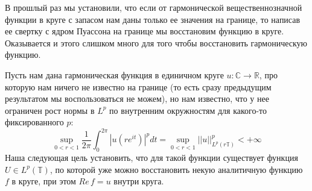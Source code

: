 \documentclass[12pt,a4paper]{article} %
\newcommand{\R}{\mathbb{R}}
\newcommand{\Co}{\mathbb{C}}
\begin{document}
	В прошлый раз мы установили, что если от гармонической вещественнозначной функции в круге с запасом нам даны только ее значения на границе, то написав ее свертку с ядром Пуассона на границе мы восстановим функцию в круге. Оказывается и этого слишком много для того чтобы восстановить гармоническую функцию.
	
	Пусть нам дана гармоническая функция в единичном круге $u:\Co\rightarrow\R$, про которую нам ничего не известно на границе (то есть сразу предыдущим результатом мы воспользоваться не можем), но нам известно, что у нее ограничен рост нормы в $L^p$ по внутренним окружностям для какого-то фиксированного $p$:
	$$\sup\limits_{0<r<1}\frac{1}{2\pi}\int_0^{2\pi}|u(re^{it})|^pdt=\sup\limits_{0<r<1}||u||_{L^p(r\mathbb{T})}^p<+\infty$$
	Наша следующая цель установить, что для такой функции существует функция\\ $U\in L^p(\mathbb{T})$, по которой уже можно восстановить некую аналитичную функцию $f$ в круге, при этом $Re\,f=u$ внутри круга.
	
\end{document}
